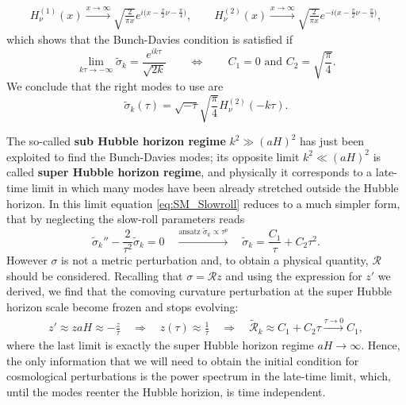 \begin{align*}
    H_\nu^{(1)}(x)\xrightarrow{x\to\infty}\sqrt{\frac{2}{\pi x} }e^{i\big(x-\frac{\pi}{2}\nu-\frac{\pi}{4}\big)},\qquad H^{(2)}_\nu(x)\xrightarrow{x\to\infty}\sqrt{\frac{2}{\pi x} }e^{-i\big(x-\frac{\pi}{2}\nu-\frac{\pi}{4}\big)},
\end{align*}
which shows that the Bunch-Davies condition is satisfied if 
$$\lim_{k\tau\to -\infty}\tilde\sigma_k=\frac{e^{ik\tau}}{\sqrt{2k}}\qquad\Longleftrightarrow\qquad C_1=0\text{ and }C_2= \sqrt{\frac{\pi}{4}}.$$
We conclude that the right modes to use are 
\begin{equation}
    \tilde\sigma_k(\tau)=\sqrt{-\tau}\sqrt{\frac{\pi}{4}}H_\nu^{(2)}(-k\tau).\label{eq:sigma_BD_mode}
\end{equation}

The so-called \textbf{sub Hubble horizon regime} $k^2\gg(aH)^2$ has just been exploited to find the Bunch-Davies modes; its opposite limit $k^2\ll(aH)^2$ is called \textbf{super Hubble horizon regime}, and physically it corresponds to a late-time limit in which many modes have been already stretched outside the Hubble horizon. In this limit equation \eqref{eq:SM_Slowroll} reduces to a much simpler form, that by neglecting the slow-roll parameters reads
$$ \tilde\sigma_k''-\frac{2}{\tau^2}\tilde\sigma_k=0\quad\xrightarrow{\text{ansatz }\tilde\sigma_k\propto \tau^p}\quad\tilde\sigma_k=\frac{C_1}{\tau}+C_2\tau^2.$$
However $\sigma$ is not a metric perturbation and, to obtain a physical quantity, $\mathcal{R}$ should be considered. Recalling that $\sigma=\mathcal{R}z$ and using the expression for $z'$ we derived, we find that the comoving curvature perturbation at the super Hubble horizon scale become frozen and stops evolving:
\begin{align*}
    z'\approx zaH\approx-\frac{z}{\tau}\quad\Rightarrow\quad z(\tau)\approx\frac{1}{\tau}\quad\Rightarrow\quad\tilde{\mathcal{R}}_k\approx C_1+C_2\tau\xrightarrow{\tau\to 0}C_1,
\end{align*}
where the last limit is exactly the super Hubble horizon regime $aH\to\infty$. Hence, the only information that we will need to obtain the initial condition for cosmological perturbations is the power spectrum in the late-time limit, which, until the modes reenter the Hubble horizion, is time independent.


